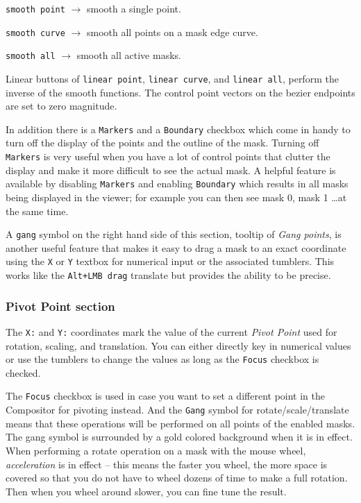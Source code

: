 \texttt{smooth point}	$\rightarrow$ smooth a single point.

\texttt{smooth curve}	$\rightarrow$ smooth all points on a mask edge curve.

\texttt{smooth all} 	$\rightarrow$ smooth all active masks.

Linear buttons of \texttt{linear point}, \texttt{linear curve}, and \texttt{linear all}, perform the inverse of the smooth functions.
The control point vectors on the bezier endpoints are set to zero magnitude.

In addition there is a \texttt{Markers} and a \texttt{Boundary} checkbox which come in handy to turn off the display of the points and the outline of the mask.  Turning off \texttt{Markers} is very useful when you have a lot of control points that clutter the display and make it more difficult to see the actual mask.  A helpful feature is available by disabling \texttt{Markers} and enabling \texttt{Boundary} which results in all masks being displayed in the viewer; for example you can then see mask 0, mask 1 \dots at the same time.

A \texttt{gang} symbol on the right hand side of this section, tooltip of \textit{Gang points}, is another useful feature that makes it easy to drag a mask to an exact coordinate using the \texttt{X} or \texttt{Y} textbox for numerical input or the associated tumblers.  This works like the \texttt{Alt+LMB drag} translate but provides the ability to be precise.

\subsubsection*{Pivot Point section}%
\label{ssub:pivot_point_section}

The \texttt{X:} and \texttt{Y:} coordinates mark the value of the current \textit{Pivot Point} used for rotation, scaling, and translation.  You can either directly key in numerical values or use the tumblers to change the values as long as the \texttt{Focus} checkbox is checked.

The \texttt{Focus} checkbox is used in case you want to set a different point in the Compositor for pivoting instead.  And the \texttt{Gang} symbol for rotate/scale/translate means that these operations will be performed on all points of the enabled masks.  The gang symbol is surrounded by a gold colored background when it is in effect.  When performing a rotate operation on a mask with the mouse wheel, \textit{acceleration} is in effect – this means the faster you wheel, the more space is covered so that you do not have to wheel dozens of time to make a full rotation.  Then when you wheel around slower, you can fine tune the result.


